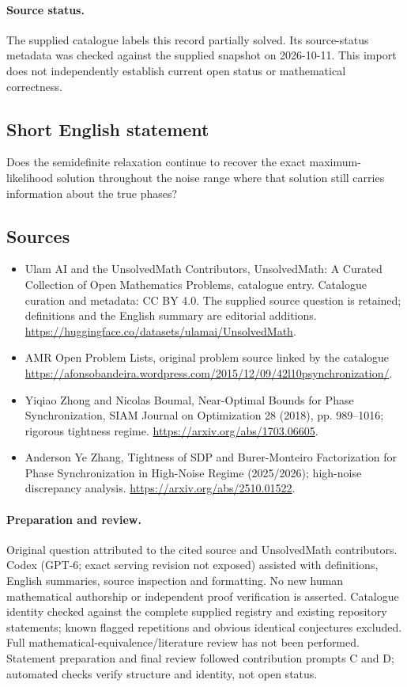 \documentclass[11pt]{article}
\begin{document}
\paragraph{Source status.}
The supplied catalogue labels this record partially solved. Its source-status metadata was checked against the supplied snapshot on 2026-10-11. This import does not independently establish current open status or mathematical correctness.
\subsection{Short English statement}
Does the semidefinite relaxation continue to recover the exact maximum-likelihood solution throughout the noise range where that solution still carries information about the true phases?
\subsection{Sources}
\begin{itemize}
\item[\hypertarget{source:statement:1}{S1}] Ulam AI and the UnsolvedMath Contributors, UnsolvedMath: A Curated Collection of Open Mathematics Problems, catalogue entry. Catalogue curation and metadata: CC BY 4.0. The supplied source question is retained; definitions and the English summary are editorial additions.
\url{https://huggingface.co/datasets/ulamai/UnsolvedMath}.
\item[\hypertarget{source:statement:2}{S2}] AMR Open Problem Lists, original problem source linked by the catalogue
\url{https://afonsobandeira.wordpress.com/2015/12/09/42l10psynchronization/}.
\item[\hypertarget{source:statement:3}{S3}] Yiqiao Zhong and Nicolas Boumal, Near-Optimal Bounds for Phase Synchronization, SIAM Journal on Optimization 28 (2018), pp. 989--1016; rigorous tightness regime.
\url{https://arxiv.org/abs/1703.06605}.
\item[\hypertarget{source:statement:4}{S4}] Anderson Ye Zhang, Tightness of SDP and Burer-Monteiro Factorization for Phase Synchronization in High-Noise Regime (2025/2026); high-noise discrepancy analysis.
\url{https://arxiv.org/abs/2510.01522}.
\end{itemize}
\paragraph{Preparation and review.}
Original question attributed to the cited source and UnsolvedMath contributors. Codex (GPT-6; exact serving revision not exposed) assisted with definitions, English summaries, source inspection and formatting. No new human mathematical authorship or independent proof verification is asserted. Catalogue identity checked against the complete supplied registry and existing repository statements; known flagged repetitions and obvious identical conjectures excluded. Full mathematical-equivalence/literature review has not been performed. Statement preparation and final review followed contribution prompts C and D; automated checks verify structure and identity, not open status.
\label{end:statement}
\end{document}
